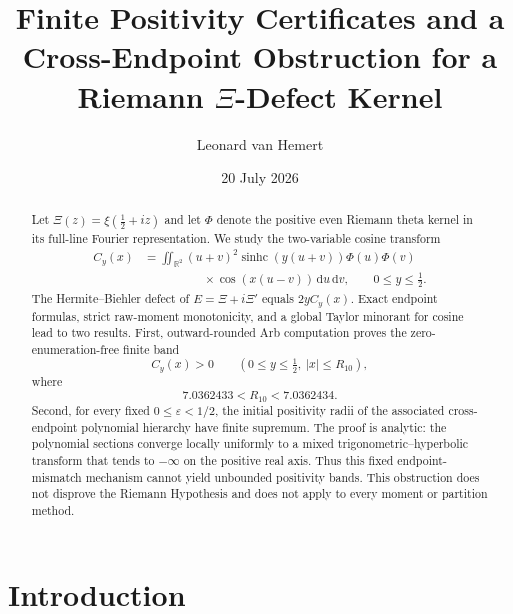\documentclass[11pt]{amsart}
\title[Finite certificates and a cross-endpoint obstruction]{Finite Positivity Certificates and a Cross-Endpoint Obstruction for a Riemann $\Xi$-Defect Kernel}
\author{Leonard van Hemert}
\date{20 July 2026}
\theoremstyle{remark}
\newcommand{\sinhc}{\operatorname{sinhc}}
\newcommand{\R}{\mathbb{R}}
\newcommand{\dd}{\,\mathrm{d}}
\begin{document}
\begin{abstract}
Let $\Xi(z)=\xi(\frac12+iz)$ and let $\Phi$ denote the positive even
Riemann theta kernel in its full-line Fourier representation.  We study the
two-variable cosine transform
\begin{align*}
C_y(x)&=\iint_{\R^2}(u+v)^2\sinhc(y(u+v))\Phi(u)\Phi(v)\\
&\hspace{5em}{}\times\cos(x(u-v))\dd u\dd v,
\qquad 0\leq y\leq\tfrac12.
\end{align*}
The Hermite--Biehler defect of $E=\Xi+i\Xi'$ equals $2yC_y(x)$.  Exact
endpoint formulas, strict raw-moment monotonicity, and a global Taylor
minorant for cosine lead to two results.  First, outward-rounded Arb
computation proves the zero-enumeration-free finite band
\[
C_y(x)>0\qquad
\left(0\leq y\leq\tfrac12,\ |x|\leq R_{10}\right),
\]
where
\[
7.0362433<R_{10}<7.0362434.
\]
Second, for every fixed $0\leq\varepsilon<1/2$, the initial positivity radii
of the associated cross-endpoint polynomial hierarchy have finite supremum.
The proof is analytic: the polynomial sections converge locally uniformly to
a mixed trigonometric--hyperbolic transform that tends to $-\infty$ on the
positive real axis.  Thus this fixed endpoint-mismatch mechanism cannot yield
unbounded positivity bands.  This obstruction does not disprove the Riemann
Hypothesis and does not apply to every moment or partition method.
\end{abstract}

\maketitle

\section{Introduction}
\end{document}
